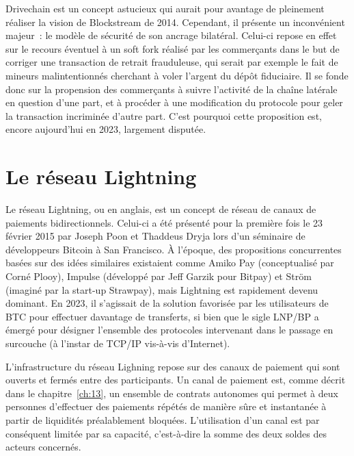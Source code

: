Drivechain est un concept astucieux qui aurait pour avantage de pleinement réaliser la vision de Blockstream de 2014. Cependant, il présente un inconvénient majeur~: le modèle de sécurité de son ancrage bilatéral. Celui-ci repose en effet sur le recours éventuel à un soft fork réalisé par les commerçants dans le but de corriger une transaction de retrait frauduleuse, qui serait par exemple le fait de mineurs malintentionnés cherchant à voler l'argent du dépôt fiduciaire. Il se fonde donc sur la propension des commerçants à suivre l'activité de la chaîne latérale en question d'une part, et à procéder à une modification du protocole pour geler la transaction incriminée d'autre part. C'est pourquoi cette proposition est, encore aujourd'hui en 2023, largement disputée.

\section*{Le réseau Lightning}


Le réseau Lightning, ou  en anglais, est un concept de réseau de canaux de paiements bidirectionnels. Celui-ci a été présenté pour la première fois le 23 février 2015 par Joseph Poon et Thaddeus Dryja lors d'un séminaire de développeurs Bitcoin à San Francisco. À l'époque, des propositions concurrentes basées sur des idées similaires existaient comme Amiko Pay (conceptualisé par Corné Plooy), Impulse (développé par Jeff Garzik pour Bitpay) et Ström (imaginé par la start-up Strawpay), mais Lightning est rapidement devenu dominant. En 2023, il s'agissait de la solution favorisée par les utilisateurs de BTC pour effectuer davantage de transferts, si bien que le sigle LNP/BP a émergé pour désigner l'ensemble des protocoles intervenant dans le passage en surcouche (à l'instar de TCP/IP vis-à-vis d'Internet).

L'infrastructure du réseau Lighning repose sur des canaux de paiement qui sont ouverts et fermés entre des participants. Un canal de paiement est, comme décrit dans le chapitre~\ref{ch:13}, un ensemble de contrats autonomes qui permet à deux personnes d'effectuer des paiements répétés de manière sûre et instantanée à partir de liquidités préalablement bloquées. L'utilisation d'un canal est par conséquent limitée par sa capacité, c'est-à-dire la somme des deux soldes des acteurs concernés.

